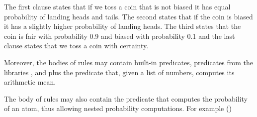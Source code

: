 \documentclass[letterpaper,10pt,english]{sphinxmanual}
\begin{document}
\begin{sphinxVerbatim}[commandchars=\\\{\}]
   
    \PYGZbs{}

   

  

\end{sphinxVerbatim}

The first clause states that if we toss a coin that is not biased it has equal probability of landing heads and
tails.
The second states that if the coin is biased it has a slightly higher probability of landing heads.
The third states that the coin is fair with probability 0.9 and biased with probability 0.1 and the last clause
states that we toss a coin with certainty.

Moreover, the bodies of rules may contain built-in predicates, predicates from the libraries ,
 and  plus the predicate 
that, given a list of numbers, computes its arithmetic mean.

The body of rules may also contain the predicate  that computes the probability of an atom,
thus allowing nested probability computations.
For example ()

\begin{sphinxVerbatim}[commandchars=\\\{\}]
      
\end{sphinxVerbatim}
\end{document}
